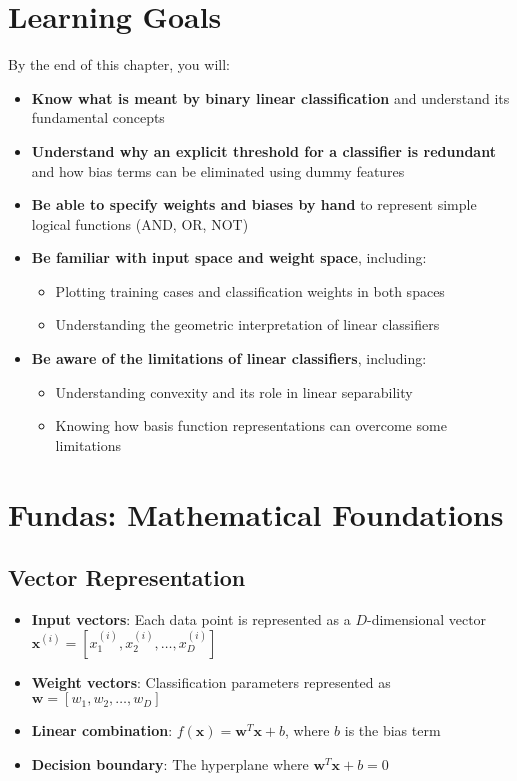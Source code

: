 \newtheorem{theorem}{Theorem}
\newtheorem{definition}{Definition}
\section{Learning Goals}

By the end of this chapter, you will:

\begin{itemize}
    \item \textbf{Know what is meant by binary linear classification} and understand its fundamental concepts
    \item \textbf{Understand why an explicit threshold for a classifier is redundant} and how bias terms can be eliminated using dummy features
    \item \textbf{Be able to specify weights and biases by hand} to represent simple logical functions (AND, OR, NOT)
    \item \textbf{Be familiar with input space and weight space}, including:
    \begin{itemize}
        \item Plotting training cases and classification weights in both spaces
        \item Understanding the geometric interpretation of linear classifiers
    \end{itemize}
    \item \textbf{Be aware of the limitations of linear classifiers}, including:
    \begin{itemize}
        \item Understanding convexity and its role in linear separability
        \item Knowing how basis function representations can overcome some limitations
    \end{itemize}
\end{itemize}

\section{Fundas: Mathematical Foundations}

\subsection{Vector Representation}
\begin{itemize}
    \item \textbf{Input vectors}: Each data point is represented as a $D$-dimensional vector $\bm{x}^{(i)} = [x_1^{(i)}, x_2^{(i)}, \ldots, x_D^{(i)}]$
    \item \textbf{Weight vectors}: Classification parameters represented as $\bm{w} = [w_1, w_2, \ldots, w_D]$
    \item \textbf{Linear combination}: $f(\bm{x}) = \bm{w}^T\bm{x} + b$, where $b$ is the bias term
    \item \textbf{Decision boundary}: The hyperplane where $\bm{w}^T\bm{x} + b = 0$
\end{itemize}

